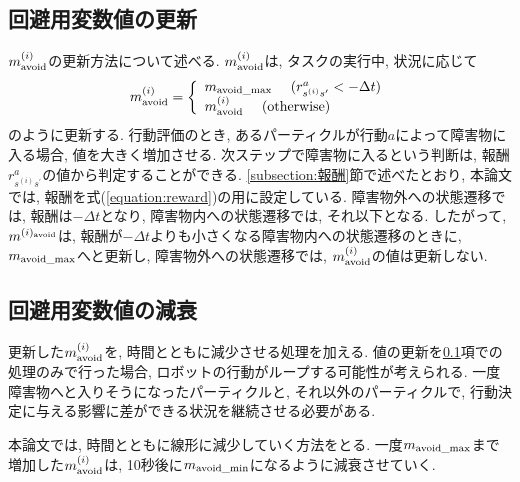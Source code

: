 \subsection{回避用変数値の更新} \label{subsection:回避用変数値の更新}
$m^{(i)}_{\rm avoid}$の更新方法について述べる. 
$m^{(i)}_{\rm avoid}$は, タスクの実行中, 状況に応じて
\begin{equation}
  m^{(i)}_{\rm avoid} =
  \left\{
    \begin{array}{l}
      m_{\rm avoid\_max} \ \ \ \ (r^{a}_{s^{(i)}s^{\prime}} < - \Delta t) \\
      m^{(i)}_{\rm avoid} \ \ \ \ ({\rm otherwise})
    \end{array}
  \right.
\end{equation}
のように更新する. 
行動評価のとき, あるパーティクルが行動$a$によって障害物に入る場合, 値を大きく増加させる. 
次ステップで障害物に入るという判断は, 報酬$r^{a}_{s^{(i)}s^{\prime}}$の値から判定することができる. 
\ref{subsection:報酬}節で述べたとおり, 本論文では, 報酬を式(\ref{equation:reward})の用に設定している. 
障害物外への状態遷移では, 報酬は$-\Delta t$となり, 障害物内への状態遷移では, それ以下となる. 
したがって, $m^{(i)_{\rm avoid}}$は, 
報酬が$-\Delta t$よりも小さくなる障害物内への状態遷移のときに, $m_{\rm avoid\_max}$へと更新し, 
障害物外への状態遷移では, $m^{(i)}_{\rm avoid}$の値は更新しない. 

\subsection{回避用変数値の減衰}
更新した$m^{(i)}_{\rm avoid}$を, 時間とともに減少させる処理を加える. 
値の更新を\ref{subsection:回避用変数値の更新}項での処理のみで行った場合, ロボットの行動がループする可能性が考えられる. 
一度障害物へと入りそうになったパーティクルと, それ以外のパーティクルで, 行動決定に与える影響に差ができる状況を継続させる必要がある. 

本論文では, 時間とともに線形に減少していく方法をとる. 
一度$m_{\rm avoid\_max}$まで増加した$m^{(i)}_{\rm avoid}$は, 10秒後に$m_{\rm avoid\_min}$になるように減衰させていく. 

